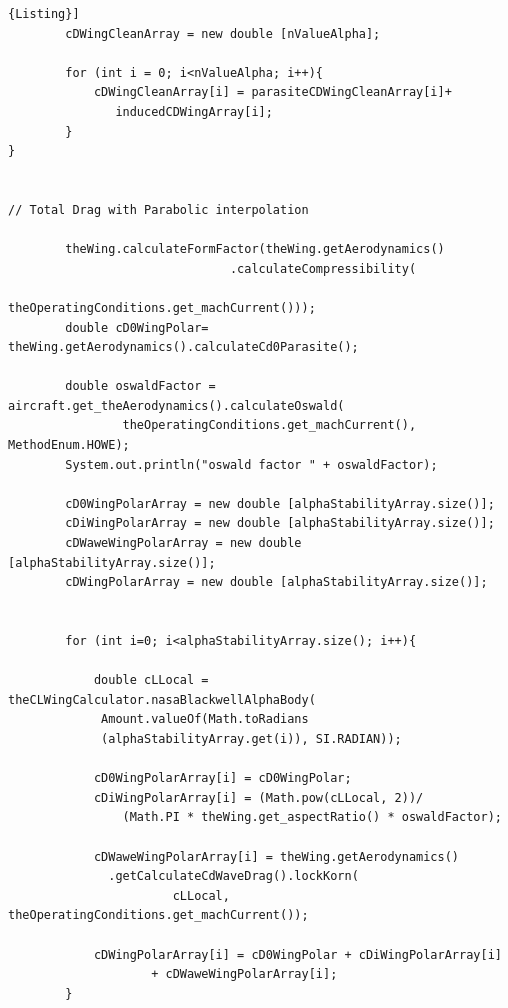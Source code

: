 \begin{lstlisting}[frame=rbl,caption={{\footnotesize Use of Drag Calculator class}},label= [style=\bfseries]{Listing}]
		cDWingCleanArray = new double [nValueAlpha];
		
		for (int i = 0; i<nValueAlpha; i++){
			cDWingCleanArray[i] = parasiteCDWingCleanArray[i]+ 
			   inducedCDWingArray[i];
		}	
}


// Total Drag with Parabolic interpolation

		theWing.calculateFormFactor(theWing.getAerodynamics()
		                       .calculateCompressibility(
		                               theOperatingConditions.get_machCurrent()));
		double cD0WingPolar= theWing.getAerodynamics().calculateCd0Parasite();

		double oswaldFactor = aircraft.get_theAerodynamics().calculateOswald(
				theOperatingConditions.get_machCurrent(), MethodEnum.HOWE);
		System.out.println("oswald factor " + oswaldFactor);

		cD0WingPolarArray = new double [alphaStabilityArray.size()];
		cDiWingPolarArray = new double [alphaStabilityArray.size()];
		cDWaweWingPolarArray = new double [alphaStabilityArray.size()];
		cDWingPolarArray = new double [alphaStabilityArray.size()];


		for (int i=0; i<alphaStabilityArray.size(); i++){

			double cLLocal = theCLWingCalculator.nasaBlackwellAlphaBody(
			 Amount.valueOf(Math.toRadians 
			 (alphaStabilityArray.get(i)), SI.RADIAN));	
			 
			cD0WingPolarArray[i] = cD0WingPolar;
			cDiWingPolarArray[i] = (Math.pow(cLLocal, 2))/
			    (Math.PI * theWing.get_aspectRatio() * oswaldFactor);
			    
			cDWaweWingPolarArray[i] = theWing.getAerodynamics()
			  .getCalculateCdWaveDrag().lockKorn(
			           cLLocal, theOperatingConditions.get_machCurrent());

			cDWingPolarArray[i] = cD0WingPolar + cDiWingPolarArray[i]
			        + cDWaweWingPolarArray[i];
		}
		
		

\end{lstlisting}


%
%
%
%
% 
% 
%	 	 

